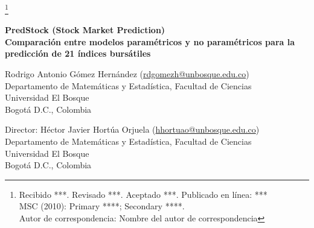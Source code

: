 \documentclass[twoside]{article}
\theoremstyle{definition}
\theoremstyle{example}
\theoremstyle{remark}
\numberwithin{equation}{section}%
\begin{document}
\label{begin-art}
\pagestyle{headings}
\thispagestyle{plain} 
\footnote{\hspace{-18.1pt} Recibido ***. Revisado ***.
Aceptado ***. Publicado en línea: *** \\ MSC (2010): Primary ****; Secondary ****.\\ Autor de correspondencia: Nombre del autor de correspondencia}
\begin{center}
{\LARGE\bfseries PredStock (Stock Market Prediction) \\
Comparación entre modelos paramétricos y no paramétricos para la predicción de 21 índices bursátiles\par }

\vspace{5mm}
{\large Rodrigo Antonio Gómez Hernández (\url{rdgomezh@unbosque.edu.co})}\\
Departamento de Matemáticas y Estadística, Facultad de Ciencias\\
Universidad El Bosque\\
Bogotá D.C., Colombia

\vspace{3mm}
{\large Director: Héctor Javier Hortúa Orjuela (\url{hhortuao@unbosque.edu.co})}\\
Departamento de Matemáticas y Estadística, Facultad de Ciencias\\
Universidad El Bosque\\
Bogotá D.C., Colombia

\end{center}
\vspace{5mm}

\begin{abstract}
 En este artículo se comparan los resultados de los modelos utilizados en la predicción de diferentes índices bursátiles y que hacen parte de los modelos de predicción utlizados en un WebSite cuyo nombre de dominio es idéntico al de este artículo. Se encontrará una breve descripción de dichos modelos entre ellos los modelos paramétricos de series de tiempo (ARMA, ARIMA, SARIMA, entre otros) y modelos no paramétricos como los modelos de redes neuronales de corta memoria LSTM, modelos de capas densas y redes neuronales bayesianas, entre otros. \\
 
{\bf Palabras y frases clave:} Predicción, modelos paramétricos, modelos no paramétricos.
\end{abstract}

\end{document}
